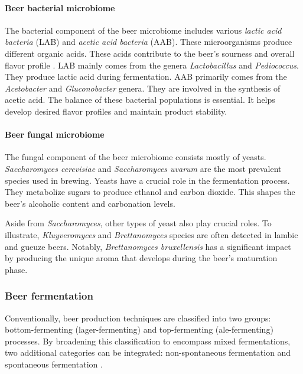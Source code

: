             \paragraph*{Beer bacterial  microbiome}
                The bacterial component of the beer microbiome includes various \textit{lactic acid bacteria} (LAB) and \textit{acetic acid bacteria} (AAB). These microorganisms produce different organic acids. These acids contribute to the beer's sourness and overall flavor profile \cite{bossaert2021description}. LAB mainly comes from the genera \textit{Lactobacillus} and \textit{Pediococcus}. They produce lactic acid during fermentation. AAB primarily comes from the \textit{Acetobacter} and \textit{Gluconobacter} genera. They are involved in the synthesis of acetic acid. The balance of these bacterial populations is essential. It helps develop desired flavor profiles and maintain product stability.
                
            \paragraph*{Beer fungal microbiome}
                The fungal component of the beer microbiome consists mostly of yeasts. \textit{Saccharomyces cerevisiae} and \textit{Saccharomyces uvarum} are the most prevalent species used in brewing. Yeasts have a crucial role in the fermentation process. They metabolize sugars to produce ethanol and carbon dioxide. This shapes the beer's alcoholic content and carbonation levels. 
                
                Aside from \textit{Saccharomyces}, other types of yeast also play crucial roles. To illustrate, \textit{Kluyveromyces} and \textit{Brettanomyces} species are often detected in lambic and gueuze beers. Notably, \textit{Brettanomyces bruxellensis} has a significant impact by producing the unique aroma that develops during the beer's maturation phase\cite{miguel2022non}.


        \subsubsection{Beer fermentation}
            Conventionally, beer production techniques are classified into two groups: bottom-fermenting (lager-fermenting) and top-fermenting (ale-fermenting) processes. By broadening this classification to encompass mixed fermentations, two additional categories can be integrated: non-spontaneous fermentation and spontaneous fermentation \cite{piraine2021mixed}.
    

